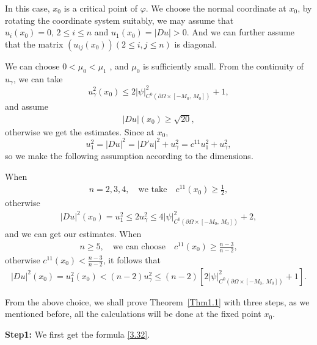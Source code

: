 \documentclass[11pt]{amsart}
\numberwithin{equation}{section}
\begin{document}
In this case, $x_0$ is a critical point of $\varphi$. We choose the normal coordinate at $x_0$, by rotating the coordinate system
suitably, we may assume that $u_i(x_0)=0,\,2\leq i\leq n$ and $u_1(x_0)=|Du|>0$. And we can further assume that the matrix $(u_{ij}(x_0))(2\leq i,j\leq n)$ is diagonal.

 We can choose $0<\mu_0< \mu_1$ , and $\mu_0$ is sufficiently small. From the continuity of $u_\gamma$, we can take
 $$u_\gamma^2(x_0)\leq 2|\psi|^2_{C^0(\partial\Omega\times[-M_0,\, M_0])}+1,$$
and assume
 \begin{align}\label{3.8c}
 |Du|(x_0)\ge \sqrt{20},
 \end{align}
  otherwise we get the estimates.
 Since at $x_0$,
 $$u_1^2 = |Du|^2=|D'u|^2+u_\gamma^2= c^{11}u_1^2 + u_\gamma^2,$$
 so we make the following assumption according to the dimensions.

 When
 \begin{align}\label{3.8a}
n=2, 3, 4, \quad \text{
 we take}\quad  c^{11}(x_0)\geq\frac{1}{2},\end{align}
   otherwise  \begin{align}\label{3.8d}|Du|^2(x_0)=u_1^2\leq 2u_\gamma^2\leq 4|\psi|^2_{C^0(\partial\Omega\times[-M_0,\, M_0])}+2,
   \end{align}
   and we can get our estimates.
 When
 \begin{align}\label{3.8b}
 n\geq 5,\quad \text{we can choose}\quad  c^{11}(x_0)\geq\frac{n-3}{n-2},
\end{align}
 otherwise $c^{11}(x_0)<\frac{n-3}{n-2}$, it follows that  \begin{align}\label{3.8e}|Du|^2(x_0)= u_1^2(x_0)< (n-2) u_\gamma^2 \leq (n-2)[2|\psi|^2_{C^0(\partial\Omega\times[-M_0,\, M_0])}+1].\end{align}


From the above choice, we shall prove Theorem~\ref{Thm1.1} with three steps, as we mentioned before, all the calculations will be done at the fixed point $x_0$.


{\bf Step1:} We first get the formula \eqref{3.32}.\par
\end{document}
